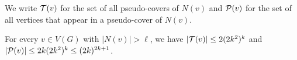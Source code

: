 
\begin{tcolorbox}
We write $\mathcal{T}(v)$ for the set of all pseudo-covers
of $N(v)$ and $\mathcal{P}(v)$ for the set of all vertices that appear in a
pseudo-cover of $N(v)$.
\end{tcolorbox}



\begin{corollary}\label{cor:nb-dominators}
For every $v\in V(G)$ with $|N(v)|> \ell$, we have
  $|\mathcal{T}(v)|\le 2(2k^2)^k$ and $|\mathcal{P}(v)|\le 2k(2k^2)^k\le (2k)^{2k+1}$.
\end{corollary}
